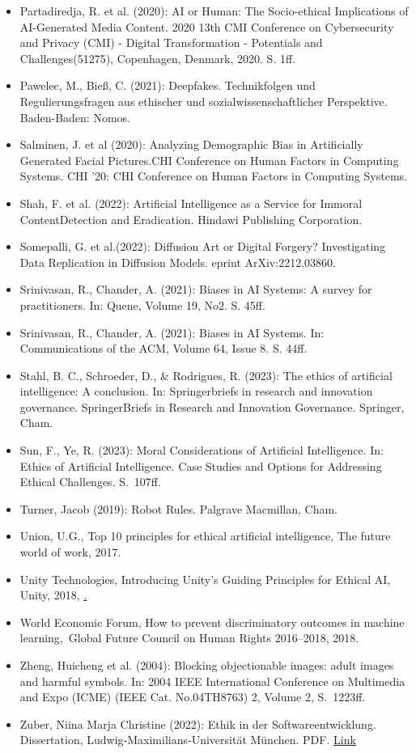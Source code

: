 \begin{itemize}
\item Partadiredja, R. et al. (2020): AI or Human: The Socio-ethical Implications of AI-Generated Media Content. 2020 13th CMI Conference on Cybersecurity and Privacy (CMI) - Digital Transformation - Potentials and Challenges(51275), Copenhagen, Denmark, 2020. S. 1ff.
\item Pawelec, M., Bieß, C. (2021):  Deepfakes. Technikfolgen und Regulierungsfragen aus ethischer und sozialwissenschaftlicher Perspektive. Baden-Baden: Nomos.
\item Salminen, J. et al (2020): Analyzing Demographic Bias in Artificially Generated Facial Pictures.CHI Conference on Human Factors in Computing Systems. CHI '20: CHI Conference on Human Factors in Computing Systems.
\item Shah, F. et al. (2022): Artificial Intelligence as a Service for Immoral ContentDetection and Eradication. Hindawi Publishing Corporation.
\item Somepalli, G. et al.(2022): Diffusion Art or Digital Forgery? Investigating Data Replication in Diffusion Models. eprint ArXiv:2212.03860.
\item Srinivasan, R., Chander, A. (2021): Biases in AI Systems: A survey for practitioners. In: Quene, Volume 19, No2. S. 45ff.
\item Srinivasan, R., Chander, A. (2021): Biases in AI Systems. In: Communications of the ACM, Volume 64, Issue 8. S. 44ff.
\item Stahl, B. C., Schroeder, D., \& Rodrigues, R. (2023): The ethics of artificial intelligence: A conclusion. In: Springerbriefs in research and innovation governance. SpringerBriefs in Research and Innovation Governance. Springer, Cham.
\item Sun, F., Ye, R. (2023): Moral Considerations of Artificial Intelligence. In: Ethics of Artificial Intelligence. Case Studies and Options for Addressing Ethical Challenges. S. 107ff.
\item Turner, Jacob (2019): Robot Rules. Palgrave Macmillan, Cham.
\item Union, U.G., Top 10 principles for ethical artificial intelligence, The future world of work,  2017.
\item Unity Technologies, Introducing Unity’s Guiding Principles for Ethical AI, Unity, 2018, \href{https://blog.unity.com/technology/introducing-unitys-guiding-principles-for-ethical-ai}.
\item World Economic Forum, How to prevent discriminatory outcomes in machine learning, Global Future Council on Human Rights 2016–2018, 2018.
\item Zheng, Huicheng et al. (2004): Blocking objectionable images: adult images and harmful symbols. In: 2004 IEEE International Conference on Multimedia and Expo (ICME) (IEEE Cat. No.04TH8763) 2, Volume 2, S. 1223ff.
\item Zuber, Niina Marja Christine (2022): Ethik in der Softwareentwicklung. Dissertation, Ludwig‐Maximilians‐Universität München. PDF. \href{https://edoc.ub.uni-muenchen.de/31152/1/Zuber_Niina_Marja_Christine.pdf}{Link}
\end{itemize}